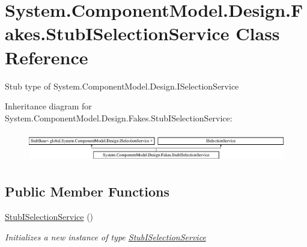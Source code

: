 \hypertarget{class_system_1_1_component_model_1_1_design_1_1_fakes_1_1_stub_i_selection_service}{\section{System.\-Component\-Model.\-Design.\-Fakes.\-Stub\-I\-Selection\-Service Class Reference}
\label{class_system_1_1_component_model_1_1_design_1_1_fakes_1_1_stub_i_selection_service}
}


Stub type of System.\-Component\-Model.\-Design.\-I\-Selection\-Service 


Inheritance diagram for System.\-Component\-Model.\-Design.\-Fakes.\-Stub\-I\-Selection\-Service\-:\begin{figure}[H]
\begin{center}
\leavevmode
\includegraphics[height=1.323877cm]{class_system_1_1_component_model_1_1_design_1_1_fakes_1_1_stub_i_selection_service}
\end{center}
\end{figure}
\subsection*{Public Member Functions}
\begin{DoxyCompactItemize}
\item 
\hyperlink{class_system_1_1_component_model_1_1_design_1_1_fakes_1_1_stub_i_selection_service_a40d4be80d3efe57a197f20f8d39a6892}{Stub\-I\-Selection\-Service} ()
\begin{DoxyCompactList}\small\item\em Initializes a new instance of type \hyperlink{class_system_1_1_component_model_1_1_design_1_1_fakes_1_1_stub_i_selection_service}{Stub\-I\-Selection\-Service}\end{DoxyCompactList}\end{DoxyCompactItemize}
